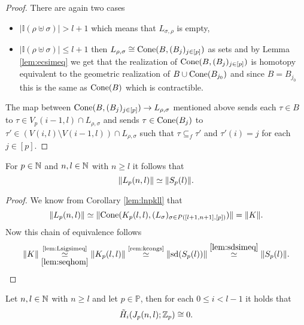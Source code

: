 \begin{proof}
  There are again two cases
  \begin{itemize}
    \item $\left|\mathbb{I}(\rho \uplus \sigma)\right| > l+1$ which means that $L_{\sigma,\rho}$ is empty,
    \item $\left|\mathbb{I}(\rho \uplus \sigma)\right| \leq l+1$ then $L_{\rho, \sigma} \cong {\rm Cone}(B, (B_j)_{j\in [p]})$ as sets and by Lemma \ref{lem:ecsimeq} we get that the realization of ${\rm Cone}(B, (B_j)_{j \in [p]})$ is homotopy equivalent to the geometric realization of $B \cup {\rm Cone}(B_{j_0})$ and since $B = B_{j_0}$ this is the same as ${\rm Cone}(B)$ which is contractible.
    \end{itemize}
    The map between ${\rm Cone}(B, (B_j)_{j\in [p]}) \to L_{\rho, \sigma}$ mentioned above sends each $\tau \in B$ to $\tau \in V_p(i-1, l) \cap L_{\rho, \sigma}$ and sends $\tau \in {\rm Cone}(B_j)$ to $\tau' \in (V(i,l) \setminus V(i-1,l))\cap L_{\rho,\sigma}$ such that $\tau \subseteq_f \tau'$ and $\tau'(i) = j$ for each $j \in [p]$.
\end{proof}

\begin{col}\label{col:lspl}
  For $p \in \mathbb{N}$ and $n,l\in \mathbb{N}$ with $n \geq l$ it follows that \[\lVert L_p(n,l) \rVert \simeq \lVert S_p(l) \rVert.\qedhere\]
\end{col}

\begin{proof}
  We know from Corollary \ref{lem:lnpkll} that \[\lVert L_p(n,l) \rVert \simeq \lVert{\rm Cone}(K_p(l,l), (L_\sigma)_{\sigma\in P([l+1,n+1],[p])})\rVert = \lVert K \rVert.\] Now this chain of equivalence follows
  \begin{equation*}
    \lVert K \rVert \underset{\ref{lem:seqhom}}{\overset{\text{\ref{lem:Lsigsimeq}}}{\simeq}} \lVert K_p(l,l) \rVert \overset{\text{\ref{rem:kcongs}}}{\simeq} \lVert {\rm sd}(S_p(l)) \rVert \overset{\ref{lem:sdsimeq}}{\simeq} \lVert S_p(l) \rVert.\qedhere
  \end{equation*}
\end{proof}

\begin{lemma}\label{lem:jc0}
  Let $n,l \in \mathbb{N}$ with $n \geq l$ and let $p \in \mathbb{P}$, then for each $0 \leq i < l-1$ it holds that
  \begin{equation*}
    \tilde{H}_i(J_p(n,l); \mathbb{Z}_p) \cong 0.
  \end{equation*}
\end{lemma}

